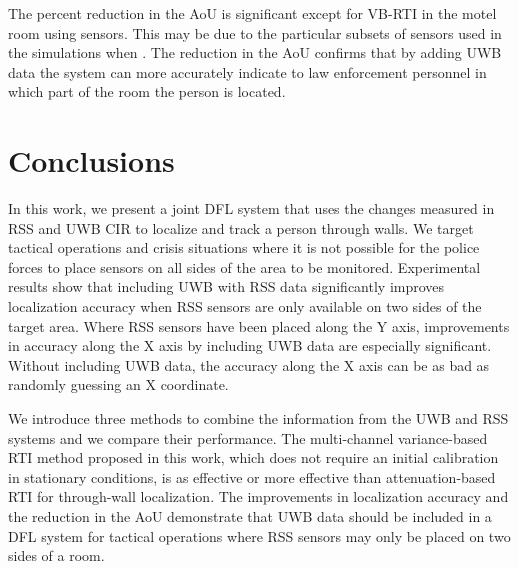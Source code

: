 \documentclass[conference]{IEEEtran}
\begin{document}
The percent reduction in the AoU is significant except for VB-RTI in
the motel room using  sensors. This may be due to the particular
subsets of sensors used in the simulations when . The reduction
in the AoU confirms that by adding UWB data the system can more
accurately indicate to law enforcement personnel in which part of the
room the person is located.



\section{Conclusions} \label{sec:conclusions}

In this work, we present a joint DFL system that uses the changes
measured in RSS and UWB CIR to localize and track a person through
walls. We target tactical operations and crisis situations where it is
not possible for the police forces to place sensors on all sides of
the area to be monitored. Experimental results show that including UWB
with RSS data significantly improves localization accuracy when RSS
sensors are only available on two sides of the target area. Where RSS
sensors have been placed along the Y axis, improvements in accuracy
along the X axis by including UWB data are especially
significant. Without including UWB data, the accuracy along the X axis
can be as bad as randomly guessing an X coordinate.

We introduce three methods to combine the information from the UWB and
RSS systems and we compare their performance. The multi-channel
variance-based RTI method proposed in this work, which does not
require an initial calibration in stationary conditions, is as
effective or more effective than attenuation-based RTI for
through-wall localization. The improvements in localization accuracy
and the reduction in the AoU demonstrate that UWB data should be
included in a DFL system for tactical operations where RSS sensors
may only be placed on two sides of a room.


 
\end{document}
